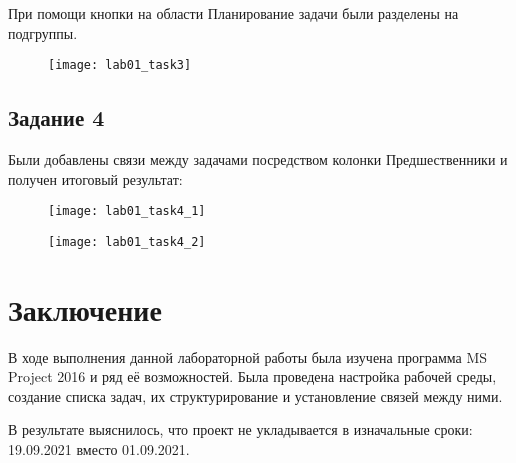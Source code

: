 При помощи кнопки на области Планирование задачи были разделены на подгруппы.

\begin{figure}[h!]
	\texttt{[image: lab01\_task3]}
\end{figure}
\clearpage

\subsection*{Задание 4}

Были добавлены связи между задачами посредством колонки Предшественники и получен итоговый результат:

\begin{figure}[h!]
	\texttt{[image: lab01\_task4\_1]}
\end{figure}

\begin{figure}[h!]
	\texttt{[image: lab01\_task4\_2]}
\end{figure}

\clearpage

\section*{Заключение}

В ходе выполнения данной лабораторной работы была изучена программа MS Project 2016 и ряд её возможностей. Была проведена настройка рабочей среды, создание списка задач, их структурирование и установление связей между ними.

В результате выяснилось, что проект не укладывается в изначальные сроки: 19.09.2021 вместо 01.09.2021.
